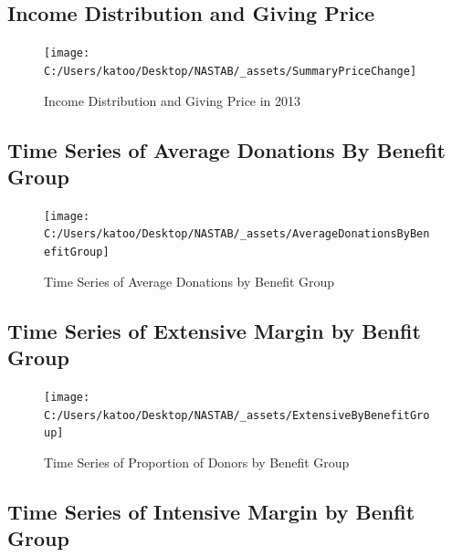 \documentclass[ review  , 3p ]{elsarticle}
\begin{document}
  \hypertarget{income-distribution-and-giving-price}{%
  \subsection{Income Distribution and Giving Price}\label{income-distribution-and-giving-price}}

  \begin{figure}

  {\centering \texttt{[image: C:/Users/katoo/Desktop/NASTAB/\_assets/SummaryPriceChange]} 

  }

  \caption{Income Distribution and Giving Price in 2013}\label{fig:unnamed-chunk-2}
  \end{figure}

  \hypertarget{time-series-of-average-donations-by-benefit-group}{%
  \subsection{Time Series of Average Donations By Benefit Group}\label{time-series-of-average-donations-by-benefit-group}}

  \begin{figure}

  {\centering \texttt{[image: C:/Users/katoo/Desktop/NASTAB/\_assets/AverageDonationsByBenefitGroup]} 

  }

  \caption{Time Series of Average Donations by Benefit Group}\label{fig:unnamed-chunk-3}
  \end{figure}

  \hypertarget{time-series-of-extensive-margin-by-benfit-group}{%
  \subsection{Time Series of Extensive Margin by Benfit Group}\label{time-series-of-extensive-margin-by-benfit-group}}

  \begin{figure}

  {\centering \texttt{[image: C:/Users/katoo/Desktop/NASTAB/\_assets/ExtensiveByBenefitGroup]} 

  }

  \caption{Time Series of Proportion of Donors by Benefit Group}\label{fig:unnamed-chunk-4}
  \end{figure}

  \hypertarget{time-series-of-intensive-margin-by-benfit-group}{%
  \subsection{Time Series of Intensive Margin by Benfit Group}\label{time-series-of-intensive-margin-by-benfit-group}}
\end{document}
